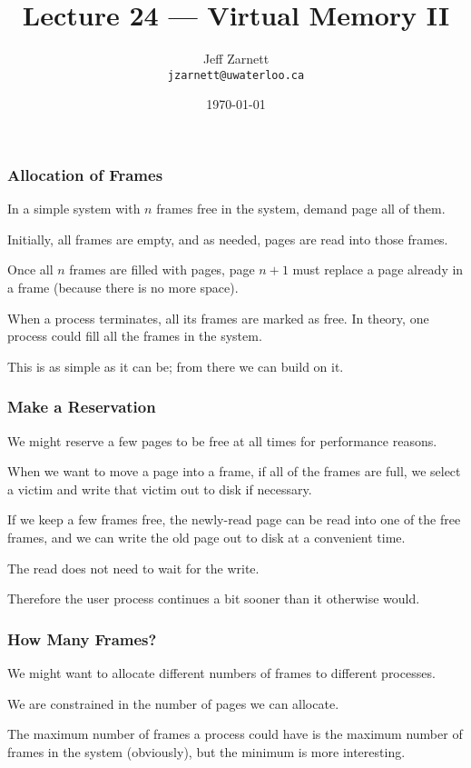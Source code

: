 

\title{Lecture 24 --- Virtual Memory II }

\author{Jeff Zarnett \\ \small \texttt{jzarnett@uwaterloo.ca}}
\date{\today}




\begin{frame}
  \titlepage

 \end{frame}


\begin{frame}
\frametitle{Allocation of Frames}

In a simple system with $n$ frames free in the system, demand page all of them. 

Initially, all frames are empty, and as needed, pages are read into those frames. 

Once all $n$ frames are filled with pages, page $n+1$ must replace a page already in a frame (because there is no more space). 

When a process terminates, all its frames are marked as free. In theory, one process could fill all the frames in the system. 

This is as simple as it can be; from there we can build on it.


\end{frame}

\begin{frame}
\frametitle{Make a Reservation}

We might reserve a few pages to be free at all times for performance reasons. 

When we want to move a page into a frame, if all of the frames are full, we select a victim and write that victim out to disk if necessary. 

If we keep a few frames free, the newly-read page can be read into one of the free frames, and we can write the old page out to disk at a convenient time. 

The read does not need to wait for the write.

Therefore the user process continues a bit sooner than it otherwise would.

\end{frame}

\begin{frame}
\frametitle{How Many Frames?}

We might want to allocate different numbers of frames to different processes.

We are constrained in the number of pages we can allocate. 

The maximum number of frames a process could have is the maximum number of frames in the system (obviously), but the minimum is more interesting.


\end{frame}

